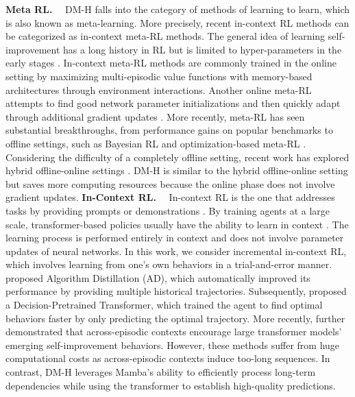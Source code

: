 \documentclass{article}
\begin{document}
\noindent\textbf{Meta RL.}~~
DM-H falls into the category of methods of learning to learn, which is also known as meta-learning. More precisely, recent in-context RL methods can be categorized as in-context meta-RL methods. The general idea of learning self-improvement has a long history in RL but is limited to hyper-parameters in the early stages \cite{31}. In-context meta-RL methods \cite{33,32} are commonly trained in the online setting by maximizing multi-episodic value functions with memory-based architectures through environment interactions. Another online meta-RL attempts to find good network parameter initializations and then quickly adapt through additional gradient updates \cite{46,45}. More recently, meta-RL has seen substantial breakthroughs, from performance gains on popular benchmarks to offline settings, such as Bayesian RL \cite{36} and optimization-based meta-RL \cite{37}. Considering the difficulty of a completely offline setting, recent work has explored hybrid offline-online settings \cite{34,35}. DM-H is similar to the hybrid offline-online setting but saves more computing resources because the online phase does not involve gradient updates.
\noindent\textbf{In-Context RL.}~~
In-context RL is the one that addresses tasks by providing prompts or demonstrations \cite{2,43}. By training agents at a large scale, transformer-based policies usually have the ability to learn in context \cite{14,27}. The learning process is performed entirely in context and does not involve parameter updates of neural networks. In this work, we consider incremental in-context RL, which involves learning from one's own behaviors in a trial-and-error manner. \citet{8} proposed Algorithm Distillation (AD), which automatically improved its performance by providing multiple historical trajectories. Subsequently, \citet{3} proposed a Decision-Pretrained Transformer, which trained the agent to find optimal behaviors faster by only predicting the optimal trajectory. More recently, \citet{1} further demonstrated that across-episodic contexts encourage large transformer models' emerging self-improvement behaviors. However, these methods suffer from huge computational costs as across-episodic contexts induce too-long sequences. In contrast, DM-H leverages Mamba's ability to efficiently process long-term dependencies while using the transformer to establish high-quality predictions.
\end{document}
